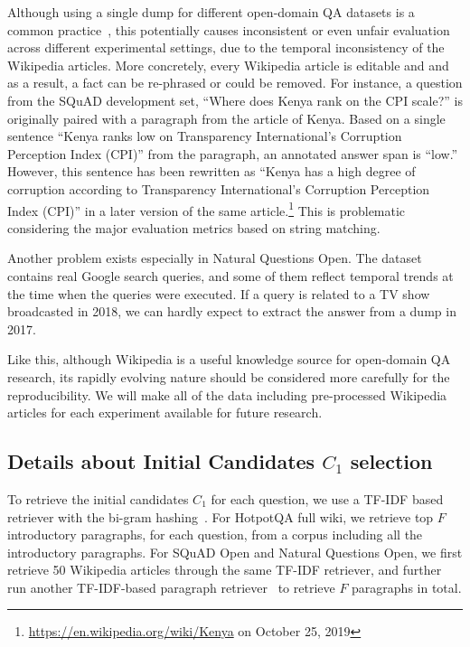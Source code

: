 Although using a single dump for different open-domain QA datasets is a common practice~\citep{chen2017reading,wang2018r,lee2018ranking}, this potentially causes inconsistent or even unfair evaluation across different experimental settings, due to the temporal inconsistency of the Wikipedia articles.
More concretely, every Wikipedia article is editable and and as a result, a fact can be re-phrased or could be removed.
For instance, a question from the SQuAD development set, ``Where does Kenya rank on the CPI scale?'' is originally paired with a paragraph from the article of Kenya.
Based on a single sentence ``Kenya ranks low on Transparency International's Corruption Perception Index (CPI)'' from the paragraph, an annotated answer span is ``low.''
However, this sentence has been rewritten as ``Kenya has a high degree of corruption according to Transparency International's Corruption Perception Index (CPI)'' in a later version of the same article.\footnote{\url{https://en.wikipedia.org/wiki/Kenya} on October 25, 2019}
This is problematic considering the major evaluation metrics based on string matching.

Another problem exists especially in Natural Questions Open.
The dataset contains real Google search queries, and some of them reflect temporal trends at the time when the queries were executed.
If a query is related to a TV show broadcasted in 2018, we can hardly expect to extract the answer from a dump in 2017.

Like this, although Wikipedia is a useful knowledge source for open-domain QA research, its rapidly evolving nature should be considered more carefully for the reproducibility. We will make all of the data including pre-processed Wikipedia articles for each experiment available for future research. 

\subsection{Details about Initial Candidates $C_1$ selection}
\label{sec:retireval_details}
To retrieve the initial candidates $C_1$ for each question, we use a TF-IDF based retriever with the bi-gram hashing~\citep{chen2017reading}.
For HotpotQA full wiki, we retrieve top $F$ introductory paragraphs, for each question, from a corpus including all the introductory paragraphs.
For SQuAD Open and Natural Questions Open, we first retrieve 50 Wikipedia articles through the same TF-IDF retriever, and further run another TF-IDF-based paragraph retriever~\citep{clark-gardner-2018-simple,min2019discrete} to retrieve $F$ paragraphs in total.

